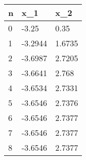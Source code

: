 \begin{tabular}{lll}
n & x_{1} & x_{2} \\ 
\hline 
0 & -3.25 & 0.35 \\ 
1 & -3.2944 & 1.6735 \\ 
2 & -3.6987 & 2.7205 \\ 
3 & -3.6641 & 2.768 \\ 
4 & -3.6534 & 2.7331 \\ 
5 & -3.6546 & 2.7376 \\ 
6 & -3.6546 & 2.7377 \\ 
7 & -3.6546 & 2.7377 \\ 
8 & -3.6546 & 2.7377 \\ 
\hline 
\end{tabular}